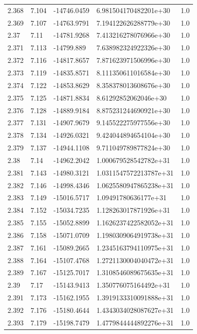 \begin{tabular}{lllll}
2.368 & 7.104 & -14746.0459 & 6.981504170482201e+30 & 1.0 \\
2.369 & 7.107 & -14763.9791 & 7.194122626288779e+30 & 1.0 \\
2.37 & 7.11 & -14781.9268 & 7.413216278076966e+30 & 1.0 \\
2.371 & 7.113 & -14799.889 & 7.638982324922326e+30 & 1.0 \\
2.372 & 7.116 & -14817.8657 & 7.871623971506996e+30 & 1.0 \\
2.373 & 7.119 & -14835.8571 & 8.111350611016584e+30 & 1.0 \\
2.374 & 7.122 & -14853.8629 & 8.358378013608676e+30 & 1.0 \\
2.375 & 7.125 & -14871.8834 & 8.61292852062046e+30 & 1.0 \\
2.376 & 7.128 & -14889.9184 & 8.875231244690921e+30 & 1.0 \\
2.377 & 7.131 & -14907.9679 & 9.145522275977556e+30 & 1.0 \\
2.378 & 7.134 & -14926.0321 & 9.424044894654104e+30 & 1.0 \\
2.379 & 7.137 & -14944.1108 & 9.711049789877824e+30 & 1.0 \\
2.38 & 7.14 & -14962.2042 & 1.000679528542782e+31 & 1.0 \\
2.381 & 7.143 & -14980.3121 & 1.0311547572213787e+31 & 1.0 \\
2.382 & 7.146 & -14998.4346 & 1.0625580947865238e+31 & 1.0 \\
2.383 & 7.149 & -15016.5717 & 1.09491780636177e+31 & 1.0 \\
2.384 & 7.152 & -15034.7235 & 1.128263017871926e+31 & 1.0 \\
2.385 & 7.155 & -15052.8899 & 1.1626237422582052e+31 & 1.0 \\
2.386 & 7.158 & -15071.0709 & 1.1980309064919738e+31 & 1.0 \\
2.387 & 7.161 & -15089.2665 & 1.2345163794110975e+31 & 1.0 \\
2.388 & 7.164 & -15107.4768 & 1.2721130004040472e+31 & 1.0 \\
2.389 & 7.167 & -15125.7017 & 1.3108546089675635e+31 & 1.0 \\
2.39 & 7.17 & -15143.9413 & 1.350776075164492e+31 & 1.0 \\
2.391 & 7.173 & -15162.1955 & 1.3919133310091888e+31 & 1.0 \\
2.392 & 7.176 & -15180.4644 & 1.4343034028087627e+31 & 1.0 \\
2.393 & 7.179 & -15198.7479 & 1.4779844444892276e+31 & 1.0 \\

\end{tabular}
